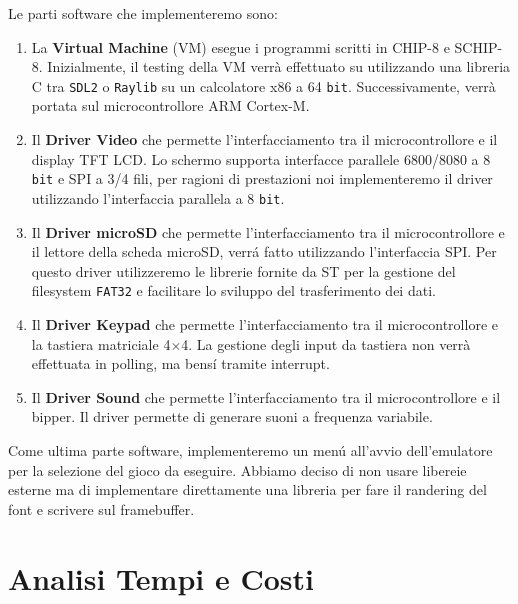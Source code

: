 \documentclass[a4paper]{article}
\begin{document}
Le parti software che implementeremo sono:

\begin{enumerate}
    \item La \textbf{Virtual Machine} (VM) esegue i programmi scritti in CHIP-8 e SCHIP-8. Inizialmente, il testing della VM verrà effettuato su utilizzando una libreria C tra \texttt{SDL2} o \texttt{Raylib} su un calcolatore \textrm{x}86 a 64 \texttt{bit}. Successivamente, verrà portata sul microcontrollore ARM Cortex-M.
    \item Il \textbf{Driver Video} che permette l'interfacciamento tra il microcontrollore e il display TFT LCD. Lo schermo supporta interfacce parallele 6800/8080 a 8 \texttt{bit} e SPI a 3/4 fili, per ragioni di prestazioni noi implementeremo il driver utilizzando l'interfaccia parallela a 8 \texttt{bit}.  
    \item Il \textbf{Driver microSD} che permette l'interfacciamento tra il microcontrollore e il lettore della scheda microSD, verrá fatto utilizzando l'interfaccia SPI. Per questo driver utilizzeremo le librerie fornite da ST per la gestione del filesystem \texttt{FAT32} e facilitare lo sviluppo del trasferimento dei dati. 
    \item Il \textbf{Driver Keypad} che permette l'interfacciamento tra il microcontrollore e la tastiera matriciale 4$\times$4. La gestione degli input da tastiera non verrà effettuata in polling, ma bens\'{i} tramite interrupt.
    \item Il \textbf{Driver Sound} che permette l'interfacciamento tra il microcontrollore e il bipper. Il driver permette di generare suoni a frequenza variabile.
\end{enumerate}

Come ultima parte software, implementeremo un men\'{u} all'avvio dell'emulatore per la selezione del gioco da eseguire. Abbiamo deciso di non usare libereie esterne ma di implementare direttamente una libreria per fare il randering del font e scrivere sul framebuffer.  

\section{Analisi Tempi e Costi}
\end{document}
